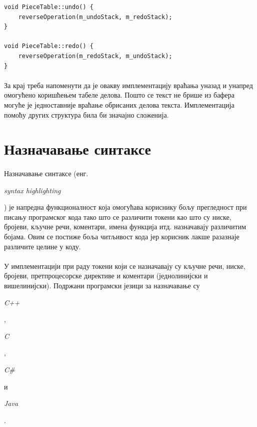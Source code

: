 \documentclass[12pt,oneside]{memoir}
\begin{document}
\begin{verbatim}
void PieceTable::undo() {
	reverseOperation(m_undoStack, m_redoStack);
}

void PieceTable::redo() {
	reverseOperation(m_redoStack, m_undoStack);
}
\end{verbatim}

\paragraph{}
За крај треба напоменути да је овакву имплементацију враћања уназад и унапред
омогућено коришћењем табеле делова. Пошто се текст не брише из бафера могуће
је једноставније враћање обрисаних делова текста. Имплементација помоћу других
структура била би значајно сложенија.

\section{Назначавање синтаксе}

\paragraph{}
Назначавање синтаксе (енг. \begin{latinica}\textit{syntax highlighting}\end{latinica})
је напредна функционалност која омогућава кориснику бољу прегледност при писању
програмског кода тако што се различити токени као што су ниске, бројеви, кључне речи, коментари, имена функција итд. назначавају различитим бојама.  Овим се постиже боља читљивост кода јер корисник лакше разазнаје различите целине у коду.

\paragraph{}
У имплементацији при раду токени који се назначавају су кључне речи, ниске, бројеви, претпроцесорске директиве и коментари (једнолинијски и вишелинијски).
Подржани програмски језици за назначавање су
\begin{latinica}\textit{C++}\end{latinica}, \begin{latinica}\textit{C}\end{latinica},
\begin{latinica}\textit{C\#}\end{latinica} и \begin{latinica}\textit{Java}\end{latinica}.
\end{document}
